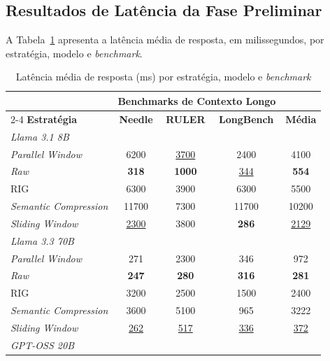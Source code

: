 \subsection{Resultados de Latência da Fase Preliminar}
\label{subsec:resultados-latencia}

A Tabela~\ref{tab:latencia} apresenta a latência média de resposta, em milissegundos, por estratégia, modelo e \textit{benchmark}.

\begin{table}[htbp]
\centering
\caption{Latência média de resposta (ms) por estratégia, modelo e \textit{benchmark}}
\label{tab:latencia}
\small
\setlength{\tabcolsep}{4.5pt}
\begin{tabular}{lccc|c}
\toprule
& \multicolumn{3}{c|}{\textbf{Benchmarks de Contexto Longo}} & \\
\cmidrule(lr){2-4}
\textbf{Estratégia} & \textbf{Needle} & \textbf{RULER} & \textbf{LongBench} & \textbf{Média} \\
\midrule
\multicolumn{5}{l}{\textit{Llama 3.1 8B}} \\
\textit{Parallel Window}      & 6200          & \underline{3700} & 2400          & 4100  \\
\textit{Raw}                  & \textbf{318}  & \textbf{1000}    & \underline{344} & \textbf{554} \\
RIG                           & 6300          & 3900             & 6300          & 5500  \\
\textit{Semantic Compression} & 11700         & 7300             & 11700         & 10200 \\
\textit{Sliding Window}       & \underline{2300} & 3800          & \textbf{286}  & \underline{2129} \\
\midrule
\multicolumn{5}{l}{\textit{Llama 3.3 70B}} \\
\textit{Parallel Window}      & 271           & 2300          & 346          & 972  \\
\textit{Raw}                  & \textbf{247}  & \textbf{280}  & \textbf{316} & \textbf{281} \\
RIG                           & 3200          & 2500          & 1500         & 2400 \\
\textit{Semantic Compression} & 3600          & 5100          & 965          & 3222 \\
\textit{Sliding Window}       & \underline{262} & \underline{517} & \underline{336} & \underline{372} \\
\midrule
\multicolumn{5}{l}{\textit{GPT-OSS 20B}} \\

\end{tabular}
\end{table}
